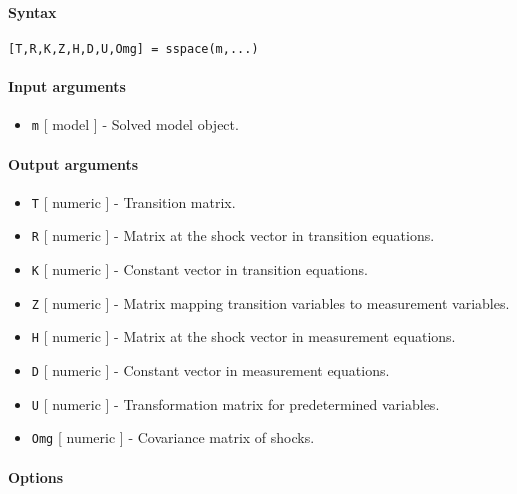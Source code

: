 


	\paragraph{Syntax}\label{syntax}

\begin{verbatim}
[T,R,K,Z,H,D,U,Omg] = sspace(m,...)
\end{verbatim}

\paragraph{Input arguments}\label{input-arguments}

\begin{itemize}
\itemsep1pt\parskip0pt
\item
  \texttt{m} {[} model {]} - Solved model object.
\end{itemize}

\paragraph{Output arguments}\label{output-arguments}

\begin{itemize}
\item
  \texttt{T} {[} numeric {]} - Transition matrix.
\item
  \texttt{R} {[} numeric {]} - Matrix at the shock vector in transition
  equations.
\item
  \texttt{K} {[} numeric {]} - Constant vector in transition equations.
\item
  \texttt{Z} {[} numeric {]} - Matrix mapping transition variables to
  measurement variables.
\item
  \texttt{H} {[} numeric {]} - Matrix at the shock vector in measurement
  equations.
\item
  \texttt{D} {[} numeric {]} - Constant vector in measurement equations.
\item
  \texttt{U} {[} numeric {]} - Transformation matrix for predetermined
  variables.
\item
  \texttt{Omg} {[} numeric {]} - Covariance matrix of shocks.
\end{itemize}

\paragraph{Options}\label{options}


